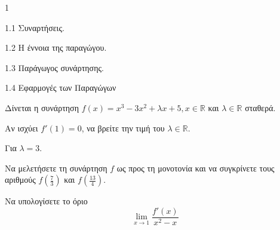 \begin{ylh}{1}
    \item 1.1 Συναρτήσεις.
    \item 1.2 Η έννοια της παραγώγου.
    \item 1.3 Παράγωγος συνάρτησης.
    \item 1.4 Εφαρμογές των Παραγώγων
\end{ylh}
Δίνεται η συνάρτηση $f(x) = x^3 - 3x^2 + \lambda x + 5, x \in \mathbb{R}$ και $\lambda \in \mathbb{R}$ σταθερά.
\begin{alist}
\item Αν ισχύει $f'(1) = 0$, να βρείτε την τιμή του $\lambda \in \mathbb{R}$. 

Για $\lambda = 3$.

\item Να μελετήσετε τη συνάρτηση $f$ ως προς τη μονοτονία και να συγκρίνετε τους αριθμούς $f\left(\frac{7}{3}\right)$ και $f\left(\frac{13}{4}\right)$. 
\item Να υπολογίσετε το όριο
\[ \lim\limits_{x\to1} \frac{f'(x)}{x^2 - x} \]
\end{alist}

